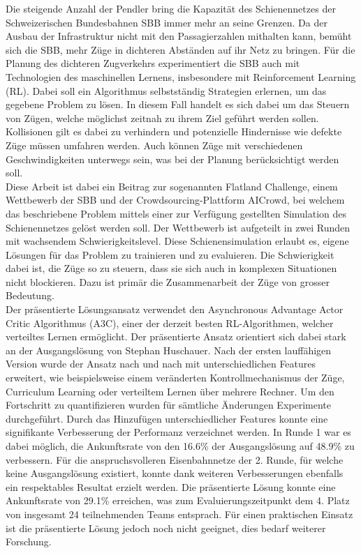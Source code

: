Die steigende Anzahl der Pendler bring die Kapazität des Schienennetzes der Schweizerischen Bundesbahnen SBB immer mehr an seine Grenzen. Da der Ausbau der Infrastruktur nicht mit den Passagierzahlen mithalten kann, bemüht sich die SBB, mehr Züge in dichteren Abständen auf ihr Netz zu bringen.
Für die Planung des dichteren Zugverkehrs experimentiert die SBB auch mit Technologien des maschinellen Lernens, insbesondere mit Reinforcement Learning (RL). Dabei soll ein Algorithmus selbstständig Strategien erlernen, um das gegebene Problem zu lösen. In diesem Fall handelt es sich dabei um das Steuern von Zügen, welche möglichst zeitnah zu ihrem Ziel geführt werden sollen. Kollisionen gilt es dabei zu verhindern und potenzielle Hindernisse wie defekte Züge müssen umfahren werden. Auch können Züge mit verschiedenen Geschwindigkeiten unterwegs sein, was bei der Planung berücksichtigt werden soll.\\
Diese Arbeit ist dabei ein Beitrag zur sogenannten Flatland Challenge, einem Wettbewerb der SBB und der Crowdsourcing-Plattform AICrowd, bei welchem das beschriebene Problem mittels einer zur Verfügung gestellten Simulation des Schienennetzes gelöst werden soll. Der Wettbewerb ist aufgeteilt in zwei Runden mit wachsendem Schwierigkeitslevel.
Diese Schienensimulation erlaubt es, eigene Lösungen für das Problem zu trainieren und zu evaluieren. Die Schwierigkeit dabei ist, die Züge so zu steuern, dass sie sich auch in komplexen Situationen nicht blockieren. Dazu ist primär die Zusammenarbeit der Züge von grosser Bedeutung.\\
Der präsentierte Lösungsansatz verwendet den Asynchronous Advantage Actor Critic Algorithmus (A3C), einer der derzeit besten RL-Algorithmen, welcher verteiltes Lernen ermöglicht. Der präsentierte Ansatz orientiert sich dabei stark an der Ausgangslösung von Stephan Huschauer.
Nach der ersten lauffähigen Version wurde der Ansatz nach und nach mit unterschiedlichen Features erweitert, wie beispielsweise einem veränderten Kontrollmechanismus der Züge, Curriculum Learning oder verteiltem Lernen über mehrere Rechner.
Um den Fortschritt zu quantifizieren wurden für sämtliche Änderungen Experimente durchgeführt. Durch das Hinzufügen unterschiedlicher Features konnte eine signifikante Verbesserung der Performanz verzeichnet werden. In Runde 1 war es dabei möglich, die Ankunftsrate von den 16.6\% der Ausgangslösung auf 48.9\% zu verbessern.
Für die anspruchsvolleren Eisenbahnnetze der 2. Runde, für welche keine Ausgangslösung existiert, konnte dank weiteren Verbesserungen ebenfalls ein respektables Resultat erzielt werden. Die präsentierte Lösung konnte eine Ankunftsrate von 29.1\% erreichen, was zum Evaluierungszeitpunkt dem 4. Platz von insgesamt 24 teilnehmenden Teams entsprach. Für einen praktischen Einsatz ist die präsentierte Lösung jedoch noch nicht geeignet, dies bedarf weiterer Forschung.
\NewPage
\thispagestyle{empty}
